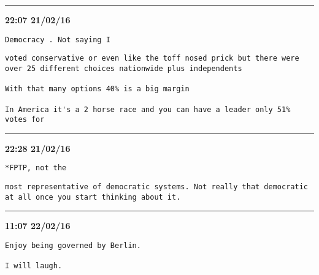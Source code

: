 \hrule%

\begin{adjustwidth}{12cm}{0cm}
\footnotesize \textbf{22:07 21/02/16}

\begin{lstlisting}[breaklines, breakatwhitespace, basicstyle=\small, frame=leftline]
Democracy . Not saying I
\end{lstlisting}
\end{adjustwidth}

\begin{adjustwidth}{0cm}{0cm}
\begin{lstlisting}[breaklines, breakatwhitespace, basicstyle=\small, frame=leftline]
 voted conservative or even like the toff nosed prick but there were over 25 different choices nationwide plus independents 

With that many options 40% is a big margin

In America it's a 2 horse race and you can have a leader only 51% votes for
\end{lstlisting}
\end{adjustwidth}

\hrule%
\begin{adjustwidth}{14cm}{0cm}
\footnotesize \textbf{22:28 21/02/16}

\begin{lstlisting}[breaklines, breakatwhitespace, basicstyle=\small, frame=leftline]
*FPTP, not the
\end{lstlisting}
\end{adjustwidth}

\begin{adjustwidth}{2cm}{0cm}

\begin{lstlisting}[breaklines, breakatwhitespace, basicstyle=\small, frame=leftline]
most representative of democratic systems. Not really that democratic at all once you start thinking about it.
\end{lstlisting}
\end{adjustwidth}

\hrule%

\begin{adjustwidth}{4cm}{0cm}
\footnotesize \textbf{11:07 22/02/16}

\begin{lstlisting}[breaklines, breakatwhitespace, basicstyle=\small, frame=leftline]
Enjoy being governed by Berlin.

I will laugh.
\end{lstlisting}
\end{adjustwidth}

